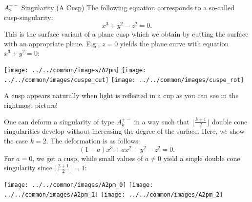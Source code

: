 \begin{surferPage}[A2+- Cusp]{$A_2^{+-}$ Singularity (A Cusp)}
	The following equation corresponds to a so-called cusp-singularity:
	\[
		x^3+y^2-z^2=0.
	\]
	This is the surface variant of a plane cusp which we obtain by cutting the surface with an appropriate plane. E.g., $z=0$ yields the plane curve with equation $x^3+y^2=0$:
	\begin{Centering*}%
		\texttt{[image: ../../common/images/A2pm]}\enspace%
		\texttt{[image: ../../common/images/cuspe\_cut]}\enspace%
		\texttt{[image: ../../common/images/cuspe\_rot]}\enspace%
	\end{Centering*}%
	A cusp appears naturally when light is reflected in a cup as you can see in the rightmost picture!

	One can deform a singularity of type $A_k^{+-}$ in a way such that $\lfloor\frac{k+1}{2}\rfloor$ double cone singularities develop without increasing the degree of the surface. Here, we show the case $k=2$. The deformation is as follows:
	\[
		(1-a)x^3+ax^2+y^2-z^2=0.
	\]
	For $a=0$, we get a cusp, while small values of $a\neq 0$ yield a single double cone singularity since $\lfloor\frac{2+1}{2}\rfloor=1$:
	\begin{Centering*}%
		\texttt{[image: ../../common/images/A2pm\_0]}\quad%
		\texttt{[image: ../../common/images/A2pm\_1]}\quad%
		\texttt{[image: ../../common/images/A2pm\_2]}%
	\end{Centering*}%
\end{surferPage}
